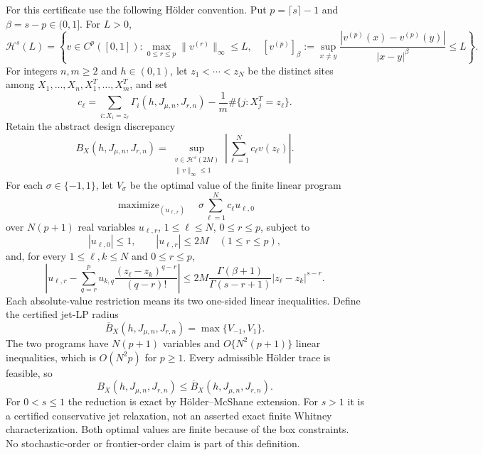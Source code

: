 For this certificate use the following H\"older convention. Put \(p=\lceil s\rceil-1\) and \(\beta=s-p\in(0,1]\). For \(L>0\),
\[
\mathcal H^s(L)=\left\{v\in C^p([0,1]):
\max_{0\le r\le p}\|v^{(r)}\|_\infty\le L,
\quad
[v^{(p)}]_{\beta}:=\sup_{x\ne y}\frac{|v^{(p)}(x)-v^{(p)}(y)|}{|x-y|^\beta}\le L
\right\}.
\]
For integers \(n,m\ge2\) and \(h\in(0,1)\), let \(z_1<\cdots<z_N\) be the distinct sites among \(X_1,\ldots,X_n,X_1^T,\ldots,X_m^T\), and set
\[
c_\ell=\sum_{i:X_i=z_\ell}\Gamma_i(h,J_{\mu,n},J_{r,n})-
\frac1m\#\{j:X_j^T=z_\ell\}.
\]
Retain the abstract design discrepancy
\[
B_X(h,J_{\mu,n},J_{r,n})=
\sup_{\substack{v\in\mathcal H^s(2M)\\ \|v\|_\infty\le1}}
\left|\sum_{\ell=1}^Nc_\ell v(z_\ell)\right|.
\]
For each \(\sigma\in\{-1,1\}\), let \(V_\sigma\) be the optimal value of the finite linear program
\[
\operatorname{maximize}_{(u_{\ell,r})}\quad
\sigma\sum_{\ell=1}^Nc_\ell u_{\ell,0}
\]
over \(N(p+1)\) real variables \(u_{\ell,r}\), \(1\le\ell\le N\), \(0\le r\le p\), subject to
\[
|u_{\ell,0}|\le1,
\qquad
|u_{\ell,r}|\le2M\quad(1\le r\le p),
\]
and, for every \(1\le\ell,k\le N\) and \(0\le r\le p\),
\[
\left|u_{\ell,r}-\sum_{q=r}^p
u_{k,q}\frac{(z_\ell-z_k)^{q-r}}{(q-r)!}\right|
\le
2M\frac{\Gamma(\beta+1)}{\Gamma(s-r+1)}|z_\ell-z_k|^{s-r}.
\]
Each absolute-value restriction means its two one-sided linear inequalities. Define the certified jet-LP radius
\[
\overline B_X(h,J_{\mu,n},J_{r,n})=\max\{V_{-1},V_1\}.
\]
The two programs have \(N(p+1)\) variables and \(O\{N^2(p+1)\}\) linear inequalities, which is \(O(N^2p)\) for \(p\ge1\). Every admissible H\"older trace is feasible, so
\[
B_X(h,J_{\mu,n},J_{r,n})\le\overline B_X(h,J_{\mu,n},J_{r,n}).
\]
For \(0<s\le1\) the reduction is exact by H\"older--McShane extension. For \(s>1\) it is a certified conservative jet relaxation, not an asserted exact finite Whitney characterization. Both optimal values are finite because of the box constraints. No stochastic-order or frontier-order claim is part of this definition.